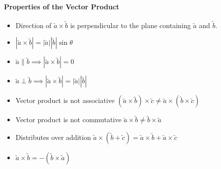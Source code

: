 \documentclass[a4paper,twoside]{article}
\begin{document}
			\paragraph{Properties of the Vector Product}
				\begin{itemize}
					\item Direction of $\utilde{a}\times\utilde{b}$ is perpendicular to the plane containing $\utilde{a}$ and $\utilde{b}$.
					\item $|\utilde{a}\times\utilde{b}|=|\utilde{a}||\utilde{b}|\sin\theta$
					\item $\utilde{a}\parallel\utilde{b}\implies|\utilde{a}\times\utilde{b}|=0$
					\item $\utilde{a}\perp\utilde{b}\implies|\utilde{a}\times\utilde{b}|=|\utilde{a}||\utilde{b}|$
					\item Vector product is not associative $\left(\utilde{a}\times\utilde{b}\right)\times\utilde{c}\neq\utilde{a}\times\left(\utilde{b}\times\utilde{c}\right)$
					\item Vector product is not commutative $\utilde{a}\times\utilde{b}\neq\utilde{b}\times\utilde{a}$
					\item Distributes over addition $\utilde{a}\times\left(\utilde{b}+\utilde{c}\right)=\utilde{a}\times\utilde{b}+\utilde{a}\times\utilde{c}$
					\item $\utilde{a}\times\utilde{b}=-\left(\utilde{b}\times\utilde{a}\right)$
				\end{itemize}
			
\end{document}
